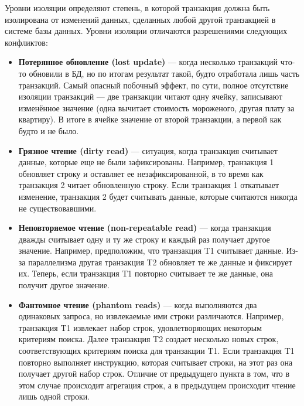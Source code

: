 Уровни изоляции определяют степень, в которой транзакция должна быть изолирована от изменений данных, сделанных любой другой транзакцией в системе базы данных. Уровни изоляции отличаются разрешениями следующих конфликтов:
\begin{itemize}
\item \textbf{Потерянное обновление (lost update)} — когда несколько транзакций что-то обновили в БД, но по итогам результат такой, будто отработала лишь часть транзакций. Самый опасный побочный эффект, по сути, полное отсутствие изоляции транзакций — две транзакции читают одну ячейку, записывают изменённое значение (одна вычитает стоимость мороженого, другая плату за квартиру). В итоге в ячейке значение от второй транзакции, а первой как будто и не было.
\item \textbf{Грязное чтение (dirty read)} — ситуация, когда транзакция считывает данные, которые еще не были зафиксированы. Например, транзакция 1 обновляет строку и оставляет ее незафиксированной, в то время как транзакция 2 читает обновленную строку. Если транзакция 1 откатывает изменение, транзакция 2 будет считывать данные, которые считаются никогда не существовавшими.
\item \textbf{Неповторяемое чтение (non-repeatable read)} — когда транзакция дважды считывает одну и ту же строку и каждый раз получает другое значение. Например, предположим, что транзакция T1 считывает данные. Из-за параллелизма другая транзакция T2 обновляет те же данные и фиксирует их. Теперь, если транзакция T1 повторно считывает те же данные, она получит другое значение.
\item \textbf{Фантомное чтение (phantom reads)} — когда выполняются два одинаковых запроса, но извлекаемые ими строки различаются. Например, транзакция T1 извлекает набор строк, удовлетворяющих некоторым критериям поиска. Далее транзакция T2 создает несколько новых строк, соответствующих критериям поиска для транзакции T1. Если транзакция T1 повторно выполняет инструкцию, которая считывает строки, на этот раз она получает другой набор строк. Отличие от предыдущего пункта в том, что в этом случае происходит агрегация строк, а в предыдущем происходит чтение лишь одной строки.
\end{itemize}

